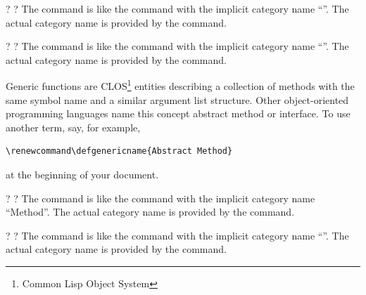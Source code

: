 \documentclass{scrartcl}
\begin{document}
{%
\begin{definition}
 \code{*}\kleene? \kleene?  
The  command is like the  command with
the implicit category name “”.  The actual category name
is provided by the  command.
\end{definition}

\begin{definition}
 \code{*}\kleene? \kleene?  
The  command is like the  command with
the implicit category name “”.  The actual category
name is provided by the  command.

Generic functions are CLOS\footnote{Common Lisp Object System}
entities describing a collection of methods with the same symbol
name and a similar argument list structure.  Other object-oriented
programming languages name this concept abstract method or interface.
To use another term, say, for example,
\begin{display}
\begin{verbatim}
\renewcommand\defgenericname{Abstract Method}
\end{verbatim}
\end{display}
at the beginning of your document.
\end{definition}

\begin{definition}
 \code{*}\kleene? \kleene?  
The  command is like the  command with
the implicit category name “Method”.  The actual category name is
provided by the  command.
\end{definition}

\begin{definition}
 \code{*}\kleene? \kleene?  
The  command is like the  command with
the implicit category name “”.  The actual category name
is provided by the  command.


\end{definition}}
\end{document}
